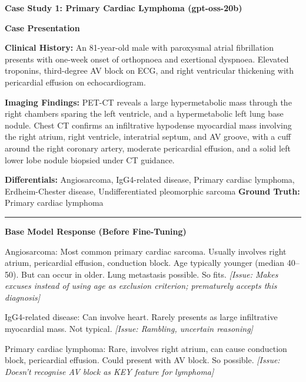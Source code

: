 \documentclass[10pt,journal,compsoc, onecolumn]{IEEEtran}
\begin{document}
\begin{casebox}
    \textbf{Case Study 1: Primary Cardiac Lymphoma (gpt-oss-20b)}

    \vspace{1em}
    \textbf{Case Presentation}
    
    \textbf{Clinical History:} An 81-year-old male with paroxysmal atrial fibrillation presents with one-week onset of orthopnoea and exertional dyspnoea. Elevated troponins, third-degree AV block on ECG, and right ventricular thickening with pericardial effusion on echocardiogram.
    
    \vspace{0.5em}
    \textbf{Imaging Findings:} PET-CT reveals a large hypermetabolic mass through the right chambers sparing the left ventricle, and a hypermetabolic left lung base nodule. Chest CT confirms an infiltrative hypodense myocardial mass involving the right atrium, right ventricle, interatrial septum, and AV groove, with a cuff around the right coronary artery, moderate pericardial effusion, and a solid left lower lobe nodule biopsied under CT guidance.
    
    \vspace{0.5em}
    \textbf{Differentials:} Angiosarcoma, IgG4-related disease, Primary cardiac lymphoma, Erdheim-Chester disease, Undifferentiated pleomorphic sarcoma \quad \textbf{Ground Truth:} Primary cardiac lymphoma
    
    \vspace{1em}
    \hrule
    \vspace{1em}

    \textbf{Base Model Response (Before Fine-Tuning)}

    \vspace{0.5em}
    Angiosarcoma: Most common primary cardiac sarcoma. Usually involves right atrium, pericardial effusion, conduction block. Age typically younger (median 40--50). But can occur in older. Lung metastasis possible. So fits. \textit{[Issue: Makes excuses instead of using age as exclusion criterion; prematurely accepts this diagnosis]}

    \vspace{0.5em}
    IgG4-related disease: Can involve heart. Rarely presents as large infiltrative myocardial mass. Not typical. \textit{[Issue: Rambling, uncertain reasoning]}

    \vspace{0.5em}
    Primary cardiac lymphoma: Rare, involves right atrium, can cause conduction block, pericardial effusion. Could present with AV block. So possible. \textit{[Issue: Doesn't recognise AV block as KEY feature for lymphoma]}


\end{casebox}
\end{document}
